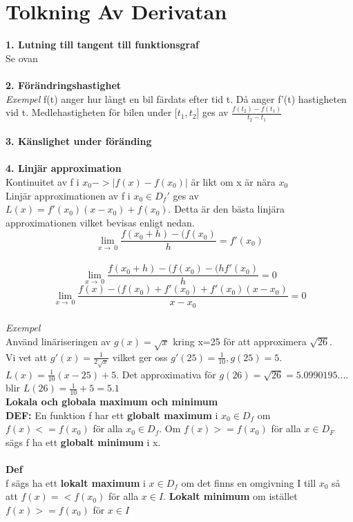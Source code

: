 \documentclass{article}
\begin{document}
	\section{Tolkning Av Derivatan}
	\textbf{1. Lutning till tangent till funktionsgraf}\\ Se ovan
	\\\\
	\textbf{2. Förändringshastighet}
	\\
	\textit{Exempel} f(t) anger hur långt en bil färdats efter tid t. Då anger f'(t) hastigheten vid t. Medlehastigheten för bilen under [$t_1,t_2$] ges av $\frac{f(t_2) - f(t_1)}{t_2 - t_1} $
	\\ \\
	\textbf{3. Känslighet under föränding}
	\\ \\
	\textbf{4. Linjär approximation}\\
	Kontinuitet av f i $x_0 -> |f(x)-f(x_0)|$ är likt om x är nära $x_0$\\
	Linjär approximationen av f i $x_0 \in D_f'$ ges av $L(x)=f'(x_0)(x-x_0)+f(x_0)$. Detta är den bästa linjära approximationen vilket bevisas enligt nedan. \\
	\[ \lim_{x\to\ 0} \frac{f(x_0+h)-(f(x_0)}{h} = f'(x_0)\]\
	\[ \lim_{x\to\ 0} \frac{f(x_0+h)-(f(x_0)-(hf'(x_0)}{h} = 0\]
	\[ \lim_{x\to\ 0} \frac{f(x)-(f(x_0)+f'(x_0)+f'(x_0)(x-x_0)}{x-x_0} = 0\] 
	\\
	\textit{Exempel} 
	\\ 
	Använd linäriseringen av $g(x)=\sqrt{x}$ kring x=25 för att approximera $\sqrt{26}$. 
	\\
	Vi vet att $g'(x)=\frac{1}{2\sqrt{x}}$ vilket ger oss $g'(25)=\frac{1}{10}, g(25)=5$.\\ $L(x)=\frac{1}{10}(x-25)+5$. Det approximativa för $g(26)=\sqrt{26}=5.0990195....$ blir $L(26)=\frac{1}{10}+5=5.1$
	\\
	\textbf{Lokala och globala maximum och minimum}\\
	\textbf{DEF:} En funktion f har ett \textbf{globalt maximum} i $x_0\in D_f$ om $f(x)<=f(x_0)$ för alla $x_0\in D_f$. Om $f(x)>=f(x_0)$ för alla $x\in D_F$ sägs f ha ett \textbf{globalt minimum} i x. \\\\
	\textbf{Def} \\
	f sägs ha ett \textbf{lokalt maximum} i $x\in D_f$ om det finns en omgivning I till $x_0$ så att $f(x)=<f(x_0)$ för alla $x\in I$.
	\textbf{Lokalt minimum} om istället $f(x)>=f(x_0)$ för $x\in I$
\end{document}
